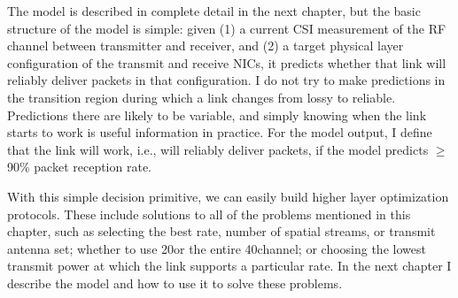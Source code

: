 The model is described in complete detail in the next chapter, but the basic structure of the model is simple: given (1) a current CSI measurement of the RF channel between transmitter and receiver, and (2) a target physical layer configuration of the transmit and receive NICs, it predicts whether that link will reliably deliver packets in that configuration. I do not try to make predictions in the transition region during which a link changes from lossy to reliable. Predictions there are likely to be variable, and simply knowing when the link starts to work is useful information in practice. For the model output, I define that the link will work, i.e., will reliably deliver packets, if the model predicts $\geq$90\% packet reception rate.

With this simple decision primitive, we can easily build higher layer optimization protocols. These include solutions to all of the problems mentioned in this chapter, such as selecting the best rate, number of spatial streams, or transmit antenna set; whether to use 20\MHz or the entire 40\MHz channel; or choosing the lowest transmit power at which the link supports a particular rate. In the next chapter I describe the model and how to use it to solve these problems.




\ifx\mainfile\undefined

\fi
